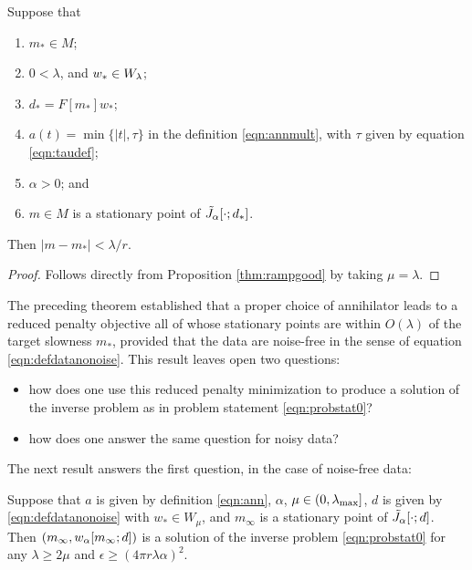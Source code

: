 \begin{corollary}
  \label{thm:rampreallygood}
  Suppose that
  \begin{enumerate}
  \item $m_* \in M$;
  \item $0 <  \lambda$, and $w_* \in W_{\lambda}$;
  \item $d_* = F[m_*]w_*$;
  \item $a(t)=\min\{|t|,\tau\}$ in the definition \ref{eqn:annmult},
    with $\tau$ given by equation \ref{eqn:taudef}; 
  \item $\alpha > 0$; and
  \item$m \in M$ is a stationary point of $\tilde{J}_{\alpha}[\cdot;d_*]$.
  \end{enumerate}
  Then $|m-m_*| < \lambda /r$.
\end{corollary}

\begin{proof} Follows directly from Proposition \ref{thm:rampgood} by
  taking $\mu=\lambda$.
\end{proof}

The preceding theorem established that a proper choice of annihilator
leads to a reduced penalty objective all of whose stationary points
are within $O(\lambda)$ of the target slowness $m_*$, provided that
the data are noise-free in the sense of equation
\ref{eqn:defdatanonoise}. This result leaves open two questions:
\begin{itemize}
\item how does one use this reduced penalty minimization to produce
  a solution of the inverse problem as in problem statement
  \ref{eqn:probstat0}? 
\item how does one answer the same question for noisy data?
\end{itemize}

The next result answers the first question, in the case of noise-free data:
\begin{proposition}
  \label{thm:ipnonoisesuf}
  Suppose that $a$ is given by definition \ref{eqn:ann}, $\alpha$,
  $\mu \in (0,\lambda_{\rm max}]$,
  $d$ is given by
  \ref{eqn:defdatanonoise} with $w_* \in W_{\mu}$, and  $m_{\infty}$ is a stationary
  point of $\tilde{J}_{\alpha}[\cdot;d]$. Then $(m_{\infty},w_{\alpha}[m_{\infty};d])$ is a
  solution of the inverse problem \ref{eqn:probstat0} for any $\lambda
  \ge 2\mu$ and $\epsilon \ge (4\pi r \lambda \alpha)^2$.
\end{proposition}

